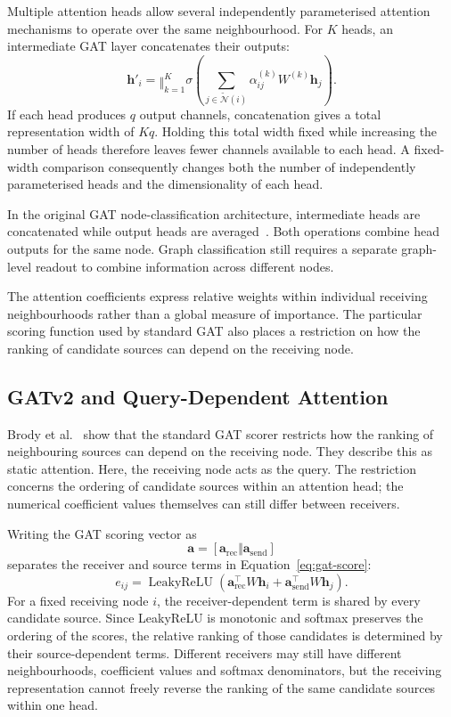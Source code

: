 \documentclass[11pt,a4paper]{article}
\begin{document}
Multiple attention heads allow several independently parameterised attention mechanisms to operate over the same neighbourhood. For \(K\) heads, an intermediate GAT layer concatenates their outputs:
\[
\mathbf{h}'_i
=
\mathop{\Vert}_{k=1}^{K}
\sigma\!\left(
\sum_{j\in\widetilde{\mathcal{N}}(i)}
\alpha_{ij}^{(k)}
W^{(k)}
\mathbf{h}_j
\right).
\]
If each head produces \(q\) output channels, concatenation gives a total representation width of \(Kq\). Holding this total width fixed while increasing the number of heads therefore leaves fewer channels available to each head. A fixed-width comparison consequently changes both the number of independently parameterised heads and the dimensionality of each head.

In the original GAT node-classification architecture, intermediate heads are concatenated while output heads are averaged~\cite{velickovic2018gat}. Both operations combine head outputs for the same node. Graph classification still requires a separate graph-level readout to combine information across different nodes.

The attention coefficients express relative weights within individual receiving neighbourhoods rather than a global measure of importance. The particular scoring function used by standard GAT also places a restriction on how the ranking of candidate sources can depend on the receiving node.

\subsection{GATv2 and Query-Dependent Attention}
\label{sec:gatv2}

Brody et al.~\cite{brody2022attentive} show that the standard GAT scorer restricts how the ranking of neighbouring sources can depend on the receiving node. They describe this as static attention. Here, the receiving node acts as the query. The restriction concerns the ordering of candidate sources within an attention head; the numerical coefficient values themselves can still differ between receivers.

Writing the GAT scoring vector as
\[
\mathbf{a}
=
[\mathbf{a}_{\mathrm{rec}}\Vert\mathbf{a}_{\mathrm{send}}]
\]
separates the receiver and source terms in Equation~\eqref{eq:gat-score}:
\[
e_{ij}
=
\operatorname{LeakyReLU}
\!\left(
\mathbf{a}_{\mathrm{rec}}^\top W\mathbf{h}_i
+
\mathbf{a}_{\mathrm{send}}^\top W\mathbf{h}_j
\right).
\]
For a fixed receiving node \(i\), the receiver-dependent term is shared by every candidate source. Since LeakyReLU is monotonic and softmax preserves the ordering of the scores, the relative ranking of those candidates is determined by their source-dependent terms. Different receivers may still have different neighbourhoods, coefficient values and softmax denominators, but the receiving representation cannot freely reverse the ranking of the same candidate sources within one head.
\end{document}
